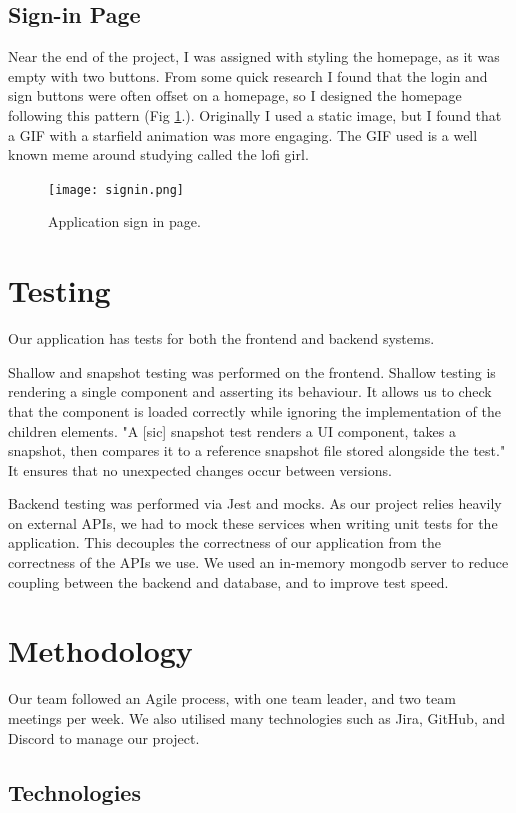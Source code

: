 \documentclass[conference]{IEEEtran}
\begin{document}
\subsection{Sign-in Page}
Near the end of the project, I was assigned with styling the homepage, as it was empty with two buttons. From some quick research I found that the login and sign buttons were often offset on a homepage, so I designed the homepage following this pattern (Fig \ref{signin}.). Originally I used a static image, but I found that a GIF with a starfield animation was more engaging. The GIF used is a well known meme around studying called the lofi girl.

\begin{figure}[htbp]
\centerline{\texttt{[image: signin.png]}}
\caption{Application sign in page.}
\label{signin}
\end{figure}

\section{Testing}
Our application has tests for both the frontend and backend systems.

Shallow and snapshot testing was performed on the frontend. Shallow testing is rendering a single component and asserting its behaviour. It allows us to check that the component is loaded correctly while ignoring the implementation of the children elements. "A [sic] snapshot test renders a UI component, takes a snapshot, then compares it to a reference snapshot file stored alongside the test.\cite{b1}" It ensures that no unexpected changes occur between versions.

Backend testing was performed via Jest and mocks. As our project relies heavily on external APIs, we had to mock these services when writing unit tests for the application. This decouples the correctness of our application from the correctness of the APIs we use. We used an in-memory mongodb server to reduce coupling between the backend and database, and to improve test speed.

\section{Methodology}
Our team followed an Agile process, with one team leader, and two team meetings per week. We also utilised many technologies such as Jira, GitHub, and Discord to manage our project.

\subsection{Technologies}
\end{document}
